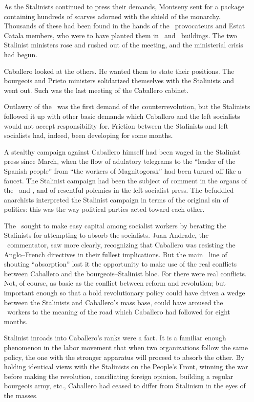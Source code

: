 As the Stalinists continued to press their demands, Montseny sent for a package containing hundreds of scarves adorned with the shield of the monarchy. Thousands of these had been found in the hands of the \PSUC\ provocateurs and Estat Catala members, who were to have planted them in \POUM\ and \CNT\ buildings. The two Stalinist ministers rose and rushed out of the meeting, and the ministerial crisis had begun.

Caballero looked at the others. He wanted them to state their positions. The bourgeois and Prieto ministers solidarized themselves with the Stalinists and went out. Such was the last meeting of the Caballero cabinet.

\dinkus

Outlawry of the \POUM\ was the first demand of the counterrevolution, but the Stalinists followed it up with other basic demands which Caballero and the left socialists would not accept responsibility for.
Friction between the Stalinists and left socialists had, indeed, been developing for some months.

A stealthy campaign against Caballero himself had been waged in the Stalinist press since March, when the flow of adulatory telegrams to the ``leader of the Spanish people'' from ``the workers of Magnitogorsk'' had been turned off like a faucet. The Stalinist campaign had been the subject of comment in the organs of the \CNT\ and \POUM\kn, and of resentful polemics in the left socialist press. The befuddled anarchists interpreted the Stalinist campaign in terms of the original sin of politics: this was the way political parties acted toward each other.

The \POUM\ sought to make easy capital among socialist workers by berating the Stalinists for attempting to absorb the socialists. Juan Andrade, the \POUM\ commentator, saw more clearly, recognizing that Caballero was resisting the Anglo--French directives in their fullest implications. But the main \POUM\ line of shouting ``ab\-sorp\-tion'' lost it the opportunity to make use of the real conflicts between Caballero and the bourgeois--Stalinist bloc. For there were real conflicts. Not, of course, as basic as the conflict between reform and revolution; but important enough so that a bold revolutionary policy could have driven a wedge between the Stalinists and Caballero’s mass base, could have aroused the \UGT\ workers to the meaning of the road which Caballero had followed for eight months.

Stalinist inroads into Caballero’s ranks were a fact. It is a familiar enough phenomenon in the labor movement that when two organizations follow the same policy, the one with the stronger apparatus will proceed to absorb the other. By holding identical views with the Stalinists on the People’s Front, winning the war before making the revolution, conciliating foreign opinion, building a regular bourgeois army, etc., Caballero had ceased to differ from Stalinism in the eyes of the masses.

